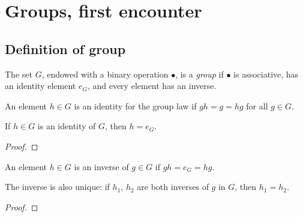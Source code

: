 \chapter{Groups, first encounter}
\label{chap:groups}

\section{Definition of group}
\label{sec:groups:definition-of-group}

\begin{definition}[Group]
  \label{def:groups:group}
  \leanok
  The set $G$, endowed with a binary operation $\bullet$, is a
  \emph{group} if $\bullet$ is associative, has an identity element
  $e_G$, and every element has an inverse.
\end{definition}

\begin{definition}
  \label{def:groups:is-identity}
  \leanok
  An element $h \in G$ is an identity for the group law if
  $gh = g = hg$ for all $g \in G$.
\end{definition}

\begin{proposition}[II.1.2]
  \label{prop:groups:identity-unique}
  \leanok
  If $h \in G$ is an identity of $G$, then $h = e_G$.
\end{proposition}
\begin{proof}
  \leanok
\end{proof}

\begin{definition}[Inverse]
  \label{def:groups:is-inverse}
  \leanok
  An element $h \in G$ is an inverse of $g \in G$ if
  $gh = e_G = hg$.
\end{definition}

\begin{proposition}[II.1.3]
  \label{prop:groups:inverse-unique}
  \leanok
  The inverse is also unique: if $h_1$, $h_2$ are both inverses of $g$
  in $G$, then $h_1 = h_2$.
\end{proposition}
\begin{proof}
  \leanok
\end{proof}

